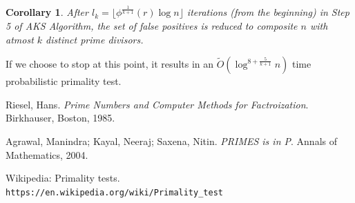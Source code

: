 \documentclass[11pt]{article}
\newtheorem{corollary}{Corollary}[theorem]
\begin{document}
\begin{corollary} After $l_k = \lfloor \phi^\frac{1}{k+1}(r) \log n \rfloor$ iterations (from the beginning) in Step 5 of AKS Algorithm, the set of false positives is reduced to composite $n$ with atmost $k$ distinct prime divisors.
\end{corollary}

If we choose to stop at this point, it results in an $\tilde O(\log^{8 + \frac{5}{k+1}} n)$ time probabilistic primality test.

\begin{thebibliography}{9}
Riesel, Hans. 
\textit{Prime Numbers and Computer Methods for Factroization}. Birkhauser, Boston, 1985.
 
Agrawal, Manindra; Kayal, Neeraj; Saxena, Nitin. \textit{PRIMES is in P}. Annals of Mathematics, 2004.

 
Wikipedia: Primality tests.
\\\texttt{https://en.wikipedia.org/wiki/Primality\_test}
\end{thebibliography}
\end{document}
